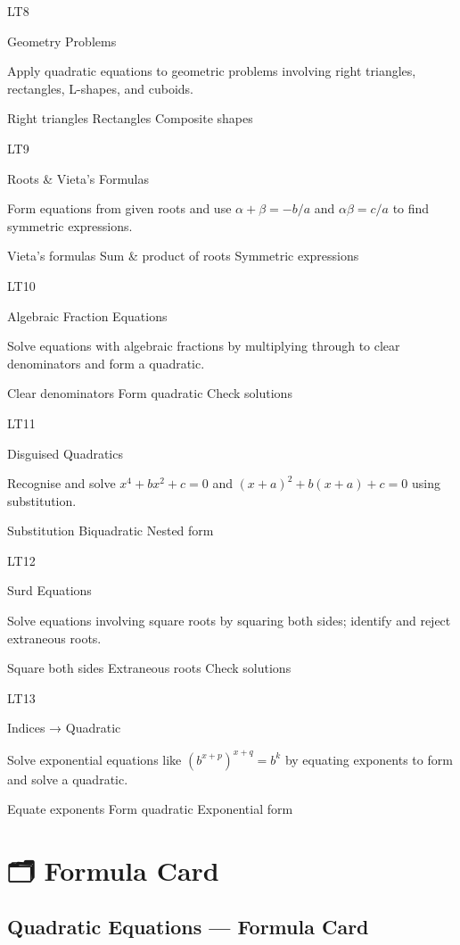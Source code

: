 \documentclass[
  letterpaper,
  DIV=11,
  numbers=noendperiod]{scrreprt}
\theoremstyle{definition}
\theoremstyle{remark}
\begin{document}
LT8

Geometry Problems

Apply quadratic equations to geometric problems involving right
triangles, rectangles, L-shapes, and cuboids.

{Right triangles} {Rectangles} {Composite shapes}

LT9

Roots \& Vieta's Formulas

Form equations from given roots and use \(\alpha+\beta = -b/a\) and
\(\alpha\beta = c/a\) to find symmetric expressions.

{Vieta's formulas} {Sum \& product of roots} {Symmetric expressions}

LT10

Algebraic Fraction Equations

Solve equations with algebraic fractions by multiplying through to clear
denominators and form a quadratic.

{Clear denominators} {Form quadratic} {Check solutions}

LT11

Disguised Quadratics

Recognise and solve \(x^4 + bx^2 + c = 0\) and
\((x+a)^2 + b(x+a) + c = 0\) using substitution.

{Substitution} {Biquadratic} {Nested form}

LT12

Surd Equations

Solve equations involving square roots by squaring both sides; identify
and reject extraneous roots.

{Square both sides} {Extraneous roots} {Check solutions}

LT13

Indices → Quadratic

Solve exponential equations like \((b^{x+p})^{x+q} = b^k\) by equating
exponents to form and solve a quadratic.

{Equate exponents} {Form quadratic} {Exponential form}

\section{🗂️ Formula Card}\label{formula-card-2}

\subsection*{Quadratic Equations --- Formula
Card}\label{quadratic-equations-formula-card}
\end{document}

